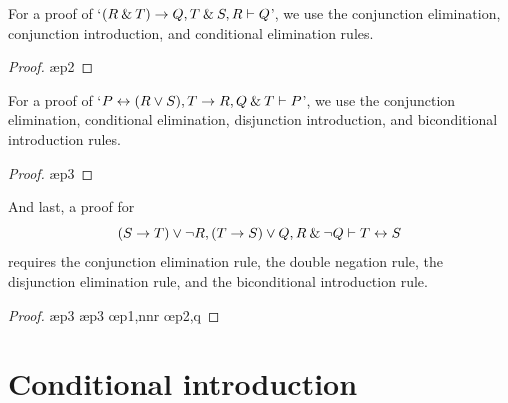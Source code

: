 \begin{earg}
\item[\ex{14.6.5}] For a proof of `$(R \mathbin{\&} T) \rightarrow Q, T \mathbin{\&} S, R \vdash Q$', we use the conjunction elimination, conjunction introduction, and conditional elimination rules.
\begin{proof}
	 \pr{}
	 \pr{}
	 \pr{}
	 \ae{p2}
	 
	 
\end{proof}\medskip

\item[\ex{14.6.6}] For a proof of `$P \leftrightarrow (R \vee S), T \rightarrow R, Q \mathbin{\&} T \vdash P$', we use the conjunction elimination, conditional elimination, disjunction introduction, and biconditional introduction rules.
\begin{proof}
	 \pr{}
	 \pr{}
	 \pr{}
	 \ae{p3}
	 
	 
	 
\end{proof}\medskip

\item[\ex{14.6.7}] And last, a proof for $$(S \rightarrow T) \vee {\neg} R, (T \rightarrow S) \vee Q, R \mathbin{\&} {\neg} Q \vdash T \leftrightarrow S$$ requires the conjunction elimination rule, the double negation rule, the disjunction elimination rule, and the biconditional introduction rule.
\begin{proof}
	 \pr{}
	 \pr{}
	 \pr{}
	 \ae{p3}
	 \ae{p3}
	 
	 \oe{p1,nnr}
	 \oe{p2,q}
	 
\end{proof}\medskip
\end{earg}


\section{Conditional introduction}\label{s:CI-rule}

